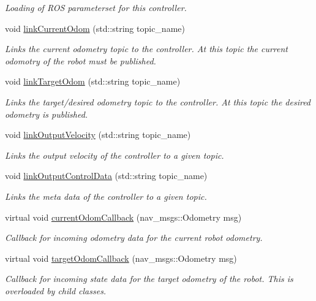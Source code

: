 \begin{DoxyCompactItemize}
\begin{DoxyCompactList}\small\item\em Loading of R\+OS parameterset for this controller. \end{DoxyCompactList}\item 
void \hyperlink{classController_aa0ea10adc7a81124663fb01693acef17}{link\+Current\+Odom} (std\+::string topic\+\_\+name)
\begin{DoxyCompactList}\small\item\em Links the current odometry topic to the controller. At this topic the current odomotry of the robot must be published. \end{DoxyCompactList}\item 
void \hyperlink{classController_a633d84f97952551654ee70acc31810c6}{link\+Target\+Odom} (std\+::string topic\+\_\+name)
\begin{DoxyCompactList}\small\item\em Links the target/desired odometry topic to the controller. At this topic the desired odometry is published. \end{DoxyCompactList}\item 
void \hyperlink{classController_a7bde6b39b2b2cccb1dd866841f672f99}{link\+Output\+Velocity} (std\+::string topic\+\_\+name)
\begin{DoxyCompactList}\small\item\em Links the output velocity of the controller to a given topic. \end{DoxyCompactList}\item 
void \hyperlink{classController_a6412541600d7444f00f8e48cea0ed024}{link\+Output\+Control\+Data} (std\+::string topic\+\_\+name)
\begin{DoxyCompactList}\small\item\em Links the meta data of the controller to a given topic. \end{DoxyCompactList}\item 
virtual void \hyperlink{classController_a9bf99e0d40660b832c2e70691e9f0a1c}{current\+Odom\+Callback} (nav\+\_\+msgs\+::\+Odometry msg)
\begin{DoxyCompactList}\small\item\em Callback for incoming odometry data for the current robot odometry. \end{DoxyCompactList}\item 
virtual void \hyperlink{classController_a77f138b6a3699c21cf904041e7e19820}{target\+Odom\+Callback} (nav\+\_\+msgs\+::\+Odometry msg)
\begin{DoxyCompactList}\small\item\em Callback for incoming state data for the target odometry of the robot. This is overloaded by child classes. \end{DoxyCompactList}\item 

\end{DoxyCompactItemize}
